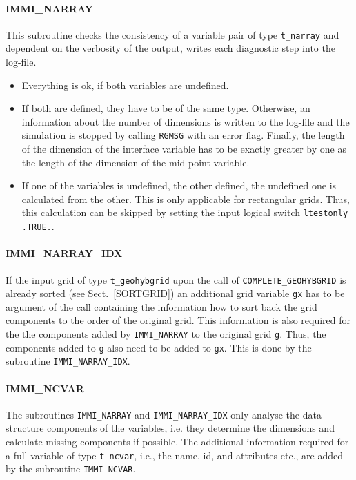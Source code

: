\documentclass[11pt,twoside]{article}
\begin{document}
\paragraph{IMMI\_NARRAY\\}
This subroutine checks the consistency of a variable pair of
type \verb|t_narray| and dependent on the verbosity of the output,
writes each diagnostic step into the log-file.
\begin{itemize}
\item Everything is ok, if both variables are undefined. 
\item If both are
defined, they have to be of the same type. Otherwise, an information
about the number of dimensions is written to the 
log-file and the simulation
is stopped by calling \verb|RGMSG| with an error flag. 
Finally, the length of the 
dimension of the interface variable has to be exactly greater by one as the
length of the dimension of the mid-point variable.
\item If one of the variables is undefined, the other defined, the undefined one
is calculated from the other. This is only applicable for rectangular
grids. Thus, this calculation can be skipped by setting the
input logical switch \verb|ltestonly| \verb|.TRUE.|.
\end{itemize}

\paragraph{IMMI\_NARRAY\_IDX\\}
If the input grid of type \verb|t_geohybgrid| upon the call
 of \verb|COMPLETE_GEOHYBGRID| is already sorted (see
 Sect.~\ref{SORTGRID}) an additional grid variable \verb|gx| has to be
argument of the call containing the information how to sort back the
 grid components to the order of the original grid.
This information is also required for the the components added
 by \verb|IMMI_NARRAY| to the original grid \verb|g|. 
Thus, the components added to \verb|g| also need to be added to \verb|gx|. 
This is done by the subroutine \verb|IMMI_NARRAY_IDX|.

\paragraph{IMMI\_NCVAR\\}
The subroutines \verb|IMMI_NARRAY| and \verb|IMMI_NARRAY_IDX| only
analyse the data structure components of the variables, i.e. they
determine the dimensions and calculate missing components if possible.
The additional information required for a full variable of
type \verb|t_ncvar|, i.e., the name, id, and attributes etc., are
added by the subroutine \verb|IMMI_NCVAR|.
\end{document}
